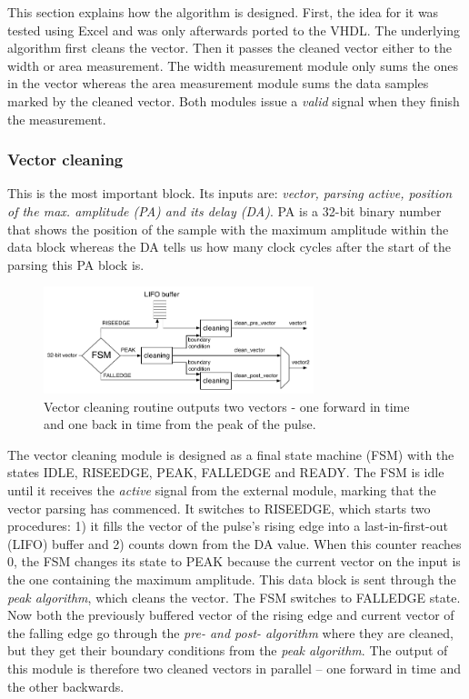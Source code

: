 \documentclass[12pt]{packages/mytustyle}  %
\begin{document}
This section explains how the algorithm is designed. First, the idea for it was tested using Excel and was only afterwards ported to the VHDL. The underlying algorithm first cleans the vector. Then it passes the cleaned vector either to the width or area measurement. The width measurement module only sums the ones in the vector whereas the area measurement module sums the data samples marked by the cleaned vector. Both modules issue a \emph{valid} signal when they finish the measurement.


 
\subsubsection{Vector cleaning}
This is the most important block. Its inputs are: \emph{vector, parsing active, position of the max. amplitude (PA) and its delay (DA)}. PA is a 32-bit binary number that shows the position of the sample with the maximum amplitude within the data block whereas the DA tells us how many clock cycles after the start of the parsing this PA block is.
\begin{figure}[!ht]
\centering
\includegraphics[width=0.7\textwidth]{plots/vector_clean}
\caption{Vector cleaning routine outputs two vectors - one forward in time and one back in time from the peak of the pulse.}
\label{fig:routine}
\end{figure}
The vector cleaning module is designed as a final state machine (FSM) with the states IDLE, RISEEDGE, PEAK, FALLEDGE and READY.  The FSM is idle until it receives the \emph{active} signal from the external module, marking that the vector parsing has commenced. It switches to RISEEDGE, which starts two procedures: 1) it fills the vector of the pulse's rising edge into a last-in-first-out (LIFO) buffer and 2) counts down from the DA value. When this counter reaches 0, the FSM changes its state to PEAK because the current vector on the input is the one containing the maximum amplitude. This data block is sent through the \emph{peak algorithm}, which cleans the vector. The FSM switches to FALLEDGE state. Now both the previously buffered vector of the rising edge and current vector of the falling edge go through the \emph{pre- and post- algorithm} where they are cleaned, but they get their boundary conditions from the \emph{peak algorithm}. The output of this module is therefore two cleaned vectors in parallel -- one forward in time and the other backwards.
\end{document}
